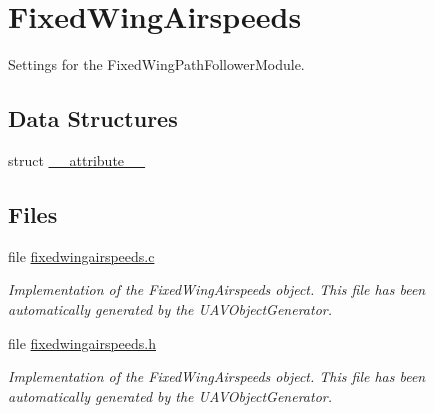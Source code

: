 \hypertarget{group___fixed_wing_airspeeds}{\section{\-Fixed\-Wing\-Airspeeds}
\label{group___fixed_wing_airspeeds}
}


\-Settings for the \-Fixed\-Wing\-Path\-Follower\-Module.  


\subsection*{\-Data \-Structures}
\begin{DoxyCompactItemize}
\item 
struct \hyperlink{struct____attribute____}{\-\_\-\-\_\-attribute\-\_\-\-\_\-}
\end{DoxyCompactItemize}
\subsection*{\-Files}
\begin{DoxyCompactItemize}
\item 
file \hyperlink{fixedwingairspeeds_8c}{fixedwingairspeeds.\-c}
\begin{DoxyCompactList}\small\item\em \-Implementation of the \-Fixed\-Wing\-Airspeeds object. \-This file has been automatically generated by the \-U\-A\-V\-Object\-Generator. \end{DoxyCompactList}\item 
file \hyperlink{fixedwingairspeeds_8h}{fixedwingairspeeds.\-h}
\begin{DoxyCompactList}\small\item\em \-Implementation of the \-Fixed\-Wing\-Airspeeds object. \-This file has been automatically generated by the \-U\-A\-V\-Object\-Generator. \end{DoxyCompactList}\end{DoxyCompactItemize}
